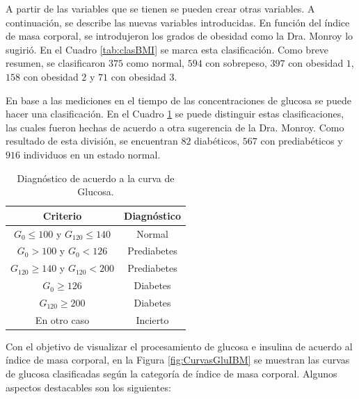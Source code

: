A partir de las variables que se tienen se pueden crear otras variables. A continuación, se describe las nuevas variables introducidas.  En función del índice de masa corporal, se introdujeron los grados de obesidad como la Dra. Monroy lo sugirió. En el Cuadro \ref{tab:clasBMI} se marca esta clasificación.
Como breve resumen, se clasificaron $375$ como normal, $594$ con sobrepeso, $397$ con obesidad $1$, $158$ con obesidad $2$ y $71$ con obesidad $3$. 
 


En base a las mediciones en el tiempo de las concentraciones de glucosa se puede hacer una clasificación. En el Cuadro \ref{tab:diagnostico} se puede distinguir estas clasificaciones, las cuales fueron hechas de acuerdo a otra sugerencia de la Dra. Monroy. Como resultado de esta división, se encuentran $82$ diabéticos, $567$ con prediabéticos y $916$ individuos en un estado normal.

\begin{table}[H]
\centering
\begin{tabular}{||c|c||}
\hline\hline
\textbf{Criterio}                       & \textbf{Diagnóstico} \\ \hline\hline
$G_0 \leq100$ y $G_{120} \leq 140$   & Normal               \\ \hline
$G_{0} > 100$ y $G_{0} < 126$  & Prediabetes          \\ \hline
$G_{120} \geq 140$ y $G_{120} < 200$ & Prediabetes          \\ \hline
$G_0 \geq 126$                     & Diabetes             \\ \hline
$G_{120} \geq 200$                  & Diabetes             \\ \hline
En otro caso                            & Incierto              \\ \hline\hline
\end{tabular}
\caption{Diagnóstico de acuerdo a la curva de Glucosa.}
\label{tab:diagnostico}
\end{table}

Con el objetivo de visualizar el procesamiento de glucosa e insulina de acuerdo al índice de masa corporal, en la Figura \ref{fig:CurvasGluIBM} se muestran las curvas de glucosa clasificadas según la categoría de índice de masa corporal. Algunos aspectos destacables son los siguientes: 


